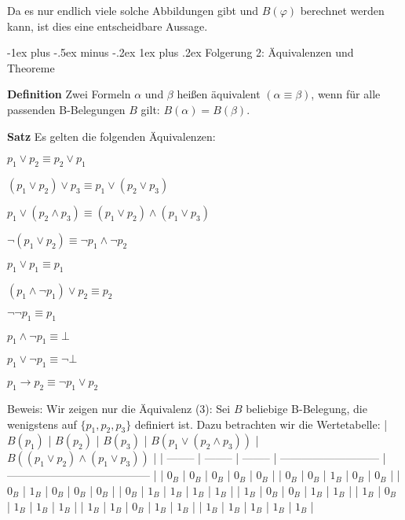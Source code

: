 \documentclass[a4paper]{article}
\makeatletter
\renewcommand{\note}[2]{\begin{noteBox} \textbf{#1} #2 \end{noteBox}}
\renewcommand{\subsubsection}{\@startsection{subsubsection}{3}{0mm}%
                {-1ex plus -.5ex minus -.2ex}%
                {1ex plus .2ex}%
                {\normalfont\small\bfseries}}
\makeatother
\begin{document}
\begin{multicols}{3}
  Da es nur endlich viele solche Abbildungen gibt und $B(\varphi)$ berechnet werden kann, ist dies eine entscheidbare Aussage.

  \subsubsection{Folgerung 2: Äquivalenzen und Theoreme}
  \note{Definition}{Zwei Formeln $\alpha$ und $\beta$ heißen äquivalent $(\alpha\equiv\beta)$, wenn für alle passenden B-Belegungen $B$ gilt: $B(\alpha) =B(\beta)$.}

  \note{Satz}{ Es gelten die folgenden Äquivalenzen:
    \begin{enumerate*}
      \item $p_1 \vee p_2 \equiv p_2 \vee p_1$
      \item $(p_1 \vee p_2 )\vee p_3 \equiv p_1 \vee (p_2 \vee p_3 )$
      \item $p_1 \vee (p_2 \wedge p_3 )\equiv (p_1 \vee p_2 )\wedge (p_1 \vee p_3 )$
      \item $\lnot(p_1 \vee p_2 )\equiv\lnot p_1 \wedge\lnot p_2$
      \item $p_1 \vee p_1 \equiv p_1$
      \item $(p_1 \wedge \lnot p_1 )\vee p_2 \equiv p_2$
      \item $\lnot\lnot p_1\equiv p_1$
      \item $p_1 \wedge\lnot p_1 \equiv\bot$
      \item $p_1 \vee\lnot p_1 \equiv\lnot\bot$
      \item $p_1 \rightarrow p_2 \equiv \lnot p_1 \vee p_2$
    \end{enumerate*}
  }

  Beweis: Wir zeigen nur die Äquivalenz (3):
  Sei $B$ beliebige B-Belegung, die wenigstens auf $\{p_1, p_2, p_3\}$ definiert ist.
  Dazu betrachten wir die Wertetabelle:
  | $B(p_1)$ | $B(p_2)$ | $B(p_3)$ | $B(p_1\vee(p_2\wedge p_3))$ | $B((p_1\vee p_2)\wedge(p_1 \vee p_3 ))$ |
  | -------- | -------- | -------- | --------------------------- | --------------------------------------- |
  | $0_B$    | $0_B$    | $0_B$    | $0_B$                       | $0_B$                                   |
  | $0_B$    | $0_B$    | $1_B$    | $0_B$                       | $0_B$                                   |
  | $0_B$    | $1_B$    | $0_B$    | $0_B$                       | $0_B$                                   |
  | $0_B$    | $1_B$    | $1_B$    | $1_B$                       | $1_B$                                   |
  | $1_B$    | $0_B$    | $0_B$    | $1_B$                       | $1_B$                                   |
  | $1_B$    | $0_B$    | $1_B$    | $1_B$                       | $1_B$                                   |
  | $1_B$    | $1_B$    | $0_B$    | $1_B$                       | $1_B$                                   |
  | $1_B$    | $1_B$    | $1_B$    | $1_B$                       | $1_B$                                   |


\end{multicols}
\end{document}
